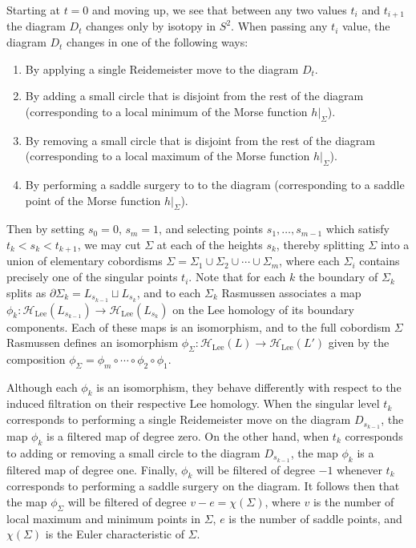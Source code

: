 \documentclass[11pt]{article}
\numberwithin{equation}{section}
\begin{document}
Starting at $t=0$ and moving up, we see that between any two values $t_i$ and $t_{i+1}$ the diagram $D_t$ changes only by isotopy in $S^2$.
When passing any $t_i$ value, the diagram $D_t$ changes in one of the following ways:
\begin{enumerate}
    \item By applying a single Reidemeister move to the diagram $D_t$.
    \item By adding a small circle that is disjoint from the rest of the diagram (corresponding to a local minimum of the Morse function $h|_\Sigma$).
    \item By removing a small circle that is disjoint from the rest of the diagram (corresponding to a local maximum of the Morse function $h|_\Sigma$).
    \item By performing a saddle surgery to to the diagram (corresponding to a saddle point of the Morse function $h|_\Sigma$).
\end{enumerate}

Then by setting $s_0=0$, $s_m=1$, and selecting points $s_1, \ldots , s_{m-1}$ which satisfy $t_k < s_k < t_{k+1}$, we may cut $\Sigma$ at each of the heights $s_k$, thereby splitting $\Sigma$ into a union of elementary cobordisms $\Sigma= \Sigma_1 \cup \Sigma_2 \cup \cdots \cup \Sigma_m$, where each $\Sigma_i$ contains precisely one of the singular points $t_i$.
Note that for each $k$ the boundary of $\Sigma_k$ splits as $\partial \Sigma_k = L_{s_{k-1}} \sqcup L_{s_k}$, and to each $\Sigma_k$ Rasmussen associates a map $\phi_k:\mathcal{H}_\text{Lee}(L_{s_{k-1}}) \rightarrow \mathcal{H}_\text{Lee}(L_{s_{k}})$ on the Lee homology of its boundary components.
Each of these maps is an isomorphism, and to the full cobordism $\Sigma$ Rasmussen defines an isomorphism $\phi_\Sigma : \mathcal{H}_\text{Lee}(L) \rightarrow \mathcal{H}_\text{Lee}(L')$ given by the composition $\phi_\Sigma = \phi_m \circ \cdots \circ \phi_2 \circ \phi_1$.
 
Although each $\phi_k$ is an isomorphism, they behave differently with respect to the induced filtration on their respective Lee homology.
When the singular level $t_k$ corresponds to performing a single Reidemeister move on the diagram $D_{s_{k-1}}$, the map $\phi_k$ is a filtered map of degree zero.
On the other hand, when $t_k$ corresponds to adding or removing a small circle to the diagram $D_{s_{k-1}}$, the map $\phi_k$ is a filtered map of degree one.
Finally, $\phi_k$ will be filtered of degree $-1$ whenever $t_k$ corresponds to performing a saddle surgery on the diagram.
It follows then that the map $\phi_\Sigma$ will be filtered of degree $v-e = \chi(\Sigma)$, where $v$ is the number of local maximum and minimum points in $\Sigma$, $e$ is the number of saddle points, and $\chi(\Sigma)$ is the Euler characteristic of $\Sigma$.
\end{document}
